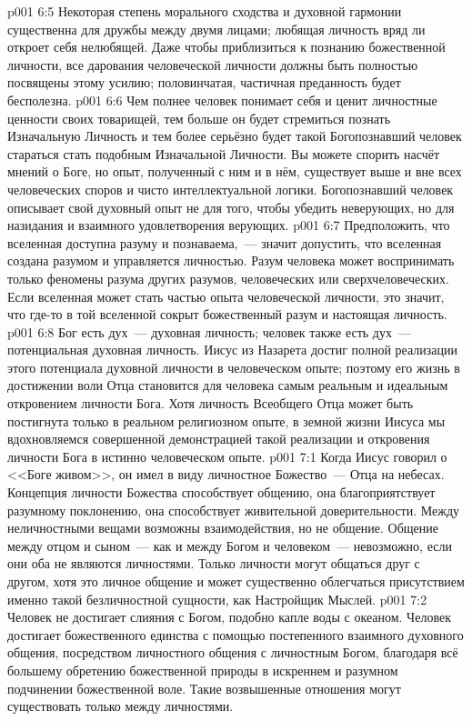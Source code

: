 \vs p001 6:5 Некоторая степень морального сходства и духовной гармонии существенна для дружбы между двумя лицами; любящая личность вряд ли откроет себя нелюбящей. Даже чтобы приблизиться к познанию божественной личности, все дарования человеческой личности должны быть полностью посвящены этому усилию; половинчатая, частичная преданность будет бесполезна.
\vs p001 6:6 Чем полнее человек понимает себя и ценит личностные ценности своих товарищей, тем больше он будет стремиться познать Изначальную Личность и тем более серьёзно будет такой Богопознавший человек стараться стать подобным Изначальной Личности. Вы можете спорить насчёт мнений о Боге, но опыт, полученный с ним и в нём, существует выше и вне всех человеческих споров и чисто интеллектуальной логики. Богопознавший человек описывает свой духовный опыт не для того, чтобы убедить неверующих, но для назидания и взаимного удовлетворения верующих.
\vs p001 6:7 \pc Предположить, что вселенная доступна разуму и познаваема,~--- значит допустить, что вселенная создана разумом и управляется личностью. Разум человека может воспринимать только феномены разума других разумов, человеческих или сверхчеловеческих. Если вселенная может стать частью опыта человеческой личности, это значит, что где\hyp{}то в той вселенной сокрыт божественный разум и настоящая личность.
\vs p001 6:8 \pc Бог есть дух~--- духовная личность; человек также есть дух~--- потенциальная духовная личность. Иисус из Назарета достиг полной реализации этого потенциала духовной личности в человеческом опыте; поэтому его жизнь в достижении воли Отца становится для человека самым реальным и идеальным откровением личности Бога. Хотя личность Всеобщего Отца может быть постигнута только в реальном религиозном опыте, в земной жизни Иисуса мы вдохновляемся совершенной демонстрацией такой реализации и откровения личности Бога в истинно человеческом опыте.
\vs p001 7:1 Когда Иисус говорил о <<Боге живом>>, он имел в виду личностное Божество~--- Отца на небесах. Концепция личности Божества способствует общению, она благоприятствует разумному поклонению, она способствует живительной доверительности. Между неличностными вещами возможны взаимодействия, но не общение. Общение между отцом и сыном~--- как и между Богом и человеком~--- невозможно, если они оба не являются личностями. Только личности могут общаться друг с другом, хотя это личное общение и может существенно облегчаться присутствием именно такой безличностной сущности, как Настройщик Мыслей.
\vs p001 7:2 Человек не достигает слияния с Богом, подобно капле воды с океаном. Человек достигает божественного единства с помощью постепенного взаимного духовного общения, посредством личностного общения с личностным Богом, благодаря всё большему обретению божественной природы в искреннем и разумном подчинении божественной воле. Такие возвышенные отношения могут существовать только между личностями.
